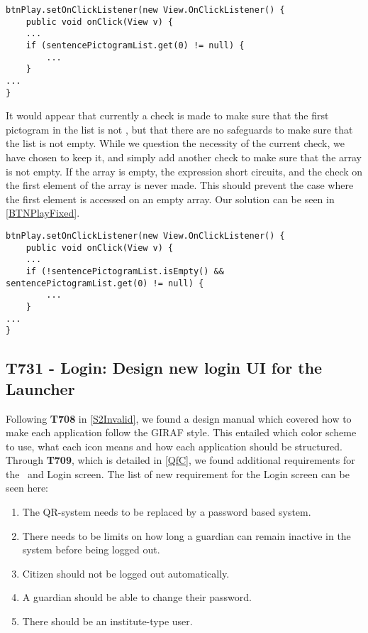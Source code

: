 \begin{minipage}[H]{\linewidth}
\begin{lstlisting}[caption = Accessing the 0th element of a null array., label = BTNPlay] 
btnPlay.setOnClickListener(new View.OnClickListener() {
	public void onClick(View v) {
	...
	if (sentencePictogramList.get(0) != null) {
		...
	}
...
}
\end{lstlisting}
\end{minipage}

It would appear that currently a check is made to make sure that the first
pictogram in the list is not , but that there are no safeguards
to make sure that the list is not empty. While we question the necessity
of the current check, we have chosen to keep it, and simply add another check to make sure that
the array is not empty. If the array is empty, the expression short
circuits, and the check on the first element of the array is never made.
This should prevent the case where the first element is accessed on an empty
array. Our solution can be seen in \autoref{BTNPlayFixed}.\nl

\begin{minipage}[H]{\linewidth}
\begin{lstlisting}[caption = Our solution to the presented problem., label = BTNPlayFixed] 
btnPlay.setOnClickListener(new View.OnClickListener() {
	public void onClick(View v) {
	...
	if (!sentencePictogramList.isEmpty() && sentencePictogramList.get(0) != null) {
		...
	}
...
}
\end{lstlisting}
\end{minipage}

\subsection{T731 - Login: Design new login UI for the Launcher}\label{DesignLogin}
Following \textbf{T708} in \autoref{S2Invalid}, we found a design manual which
covered how to make each application follow the GIRAF style. This entailed which color
scheme to use, what each icon means and how each application should be
structured. Through \textbf{T709}, which is detailed in \autoref{QfC}, we
found additional requirements for the \lapp\ and Login screen. The list of new
requirement for the Login screen can be seen here:

 \begin{enumerate}
   \item The QR-system needs to be replaced by a password based system.
   \item There needs to be limits on how long a guardian can remain inactive in
   the system before being logged out. 
   \item Citizen should not be logged out automatically. 
   \item A guardian should be able to change their password.
   \item There should be an institute-type user.
 \end{enumerate}

